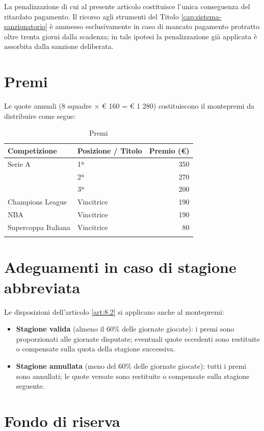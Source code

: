 La penalizzazione di cui al presente articolo costituisce l'unica conseguenza del ritardato pagamento. Il ricorso agli strumenti del Titolo \ref{cap:sistema-sanzionatorio} è ammesso esclusivamente in caso di mancato pagamento protratto oltre trenta giorni dalla scadenza; in tale ipotesi la penalizzazione già applicata è assorbita dalla sanzione deliberata.

\section{Premi}
\label{art:10.3}

Le quote annuali (8 squadre × € 160 = € 1 280) costituiscono il montepremi da distribuire come segue:

\begin{longtable}{|l|l|r|}
\hline
\textbf{Competizione} & \textbf{Posizione / Titolo} & \textbf{Premio (€)} \\
\hline
Serie A & 1ª & 350 \\
        & 2ª & 270 \\
        & 3ª & 200 \\ \hline
Champions League & Vincitrice & 190 \\ \hline
NBA & Vincitrice & 190 \\ \hline
Supercoppa Italiana & Vincitrice & 80 \\ \hline
\caption{Premi}
\end{longtable}

\section{Adeguamenti in caso di stagione abbreviata}
\label{art:10.4}

Le disposizioni dell'articolo \ref{art:8.2} si applicano anche al montepremi:

\begin{itemize}
\item \textbf{Stagione valida} (almeno il 60\% delle giornate giocate): i premi sono proporzionati alle giornate disputate; eventuali quote eccedenti sono restituite o compensate sulla quota della stagione successiva.
\item \textbf{Stagione annullata} (meno del 60\% delle giornate giocate): tutti i premi sono annullati; le quote versate sono restituite o compensate sulla stagione seguente.
\end{itemize}

\section{Fondo di riserva}
\label{art:10.5}


